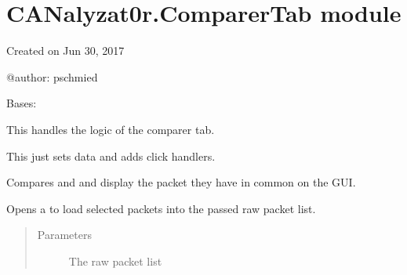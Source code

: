 \documentclass[letterpaper,10pt,english]{sphinxmanual}
\begin{document}
\section{CANalyzat0r.ComparerTab module}
\label{\detokenize{src:canalyzat0r-comparertab-module}}\label{\detokenize{src:module-src.ComparerTab}}
Created on Jun 30, 2017

@author: pschmied

\begin{fulllineitems}
\label{\detokenize{src:src.ComparerTab.ComparerTab}}
Bases: {\hyperref[\detokenize{src:src.AbstractTab.AbstractTab}]{}}

This handles the logic of the comparer tab.

\begin{fulllineitems}
\label{\detokenize{src:src.ComparerTab.ComparerTab.__init__}}
This just sets data and adds click handlers.

\end{fulllineitems}


\begin{fulllineitems}
\label{\detokenize{src:src.ComparerTab.ComparerTab.compare}}
Compares  and  and display the packet they have in common on the GUI.

\end{fulllineitems}


\begin{fulllineitems}
\label{\detokenize{src:src.ComparerTab.ComparerTab.getPacketSet}}
Opens a {\hyperref[\detokenize{src:src.PacketsDialog.PacketsDialog}]{}} to load selected packets into the passed raw packet list.
\begin{quote}\begin{description}
\item[{Parameters}] \leavevmode
{} \textendash{} The raw packet list


\end{description}
\end{quote}
\end{fulllineitems}
\end{fulllineitems}
\end{document}
